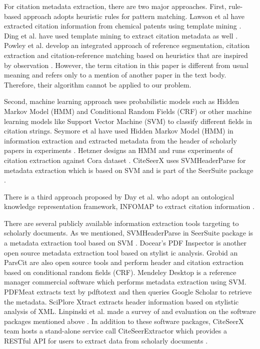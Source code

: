 \documentclass[prodmode]{acmsmall} %
\begin{document}
For citation metadata extraction, there are two major approaches. First, rule-based approach adopts heuristic rules for pattern matching. Lawson et al have extracted citation information from chemical patents using template mining \cite{lawson1996automatic}. Ding et al. have used template mining to extract citation metadata as well \cite{ding1999template}. Powley et al. develop an integrated approach of reference segmentation, citation extraction and citation-reference matching based on heuristics that are inspired by observation \cite{powley2007evidence}. However, the term citation in this paper is different from usual meaning and refers only to a mention of another paper in the text body. Therefore, their algorithm cannot be applied to our problem.

Second, machine learning approach uses probabilistic models such as  Hidden Markov Model (HMM)  and Conditional Random Fields (CRF) or other machine learning models like Support Vector Machine (SVM) to classify different fields in citation strings. Seymore et al have used Hidden Markov Model (HMM) in information extraction and extracted metadata from the header of scholarly papers in experiments \cite{seymore1999learning}. Hetzner designs an HMM and runs experiments of citation extraction against Cora dataset \cite{hetzner2008simple}. CiteSeerX uses SVMHeaderParse for metadata extraction which is based on SVM and is part of the SeerSuite package \cite{han2003automatic}.

There is a third approach proposed by Day et al. who adopt an ontological knowledge representation framework, INFOMAP to extract citation information \cite{day2005knowledge} \cite{day2007reference}.

There are several publicly available information extraction tools targeting to scholarly documents. As we mentioned, SVMHeaderParse in SeerSuite package is a metadata extraction tool based on SVM  \cite{han2003automatic}.  Docear's PDF Inspector is another open source metadata extraction tool based on stylist ic analysis. Grobid \cite{lopez2009grobid} an ParsCit \cite{councill2008parscit} are also open source tools and perform header and citation extraction based on conditional random fields (CRF). Mendeley Desktop is a reference manager commercial software which performs metadata extraction using SVM. PDFMeat \cite{aumuller2011pdfmeat} extracts text by pdftotext and then queries Google Scholar to retrieve the metadata. SciPlore Xtract \cite{beel2010sciplore} extracts header information based on stylistic analysis of XML. Linpinski et al. made a survey of and evaluation on the software packages mentioned above \cite{lipinski2013evaluation}. In addition to these software packages, CiteSeerX team hosts a stand-alone service call CiteSeerExtractor which provides a RESTful API for users to extract data from scholarly documents \cite{williams2014scholarly}.
\end{document}
